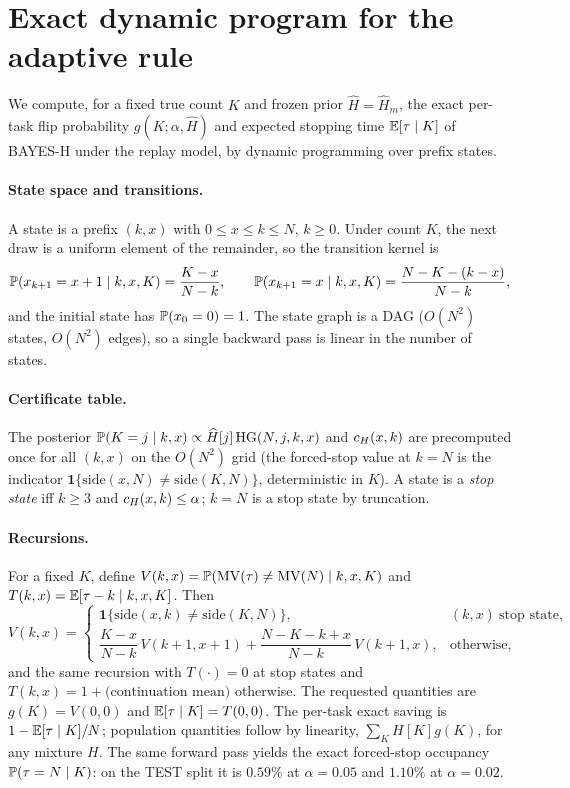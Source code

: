 \section{Exact dynamic program for the adaptive rule}
\label{app:dp}

We compute, for a fixed true count $K$ and frozen prior
$\widehat H=\widehat H_m$, the exact per-task flip probability
$g(K;\alpha,\widehat H)$ and expected stopping time $\E[\tau\mid K]$ of
BAYES-H under the replay model, by dynamic programming over prefix states.

\paragraph{State space and transitions.}
A state is a prefix $(k,x)$ with $0\le x\le k\le N$, $k\ge 0$. Under
count $K$, the next draw is a uniform element of the remainder, so the
transition kernel is
\[
\P(x_{k+1}=x+1\mid k,x,K)=\frac{K-x}{N-k},
\qquad
\P(x_{k+1}=x\mid k,x,K)=\frac{N-K-(k-x)}{N-k},
\]
and the initial state has $\P(x_0=0)=1$. The state graph is a DAG
($O(N^2)$ states, $O(N^2)$ edges), so a single backward pass is linear
in the number of states.

\paragraph{Certificate table.}
The posterior $\P(K=j\mid k,x)\propto \widehat H[j]\,\HG(N,j,k,x)$ and
$\cert(x,k)$ are precomputed once for all $(k,x)$ on the $O(N^2)$ grid
(the forced-stop value at $k=N$ is the indicator
$\mathbf 1\{\mathrm{side}(x,N)\neq\mathrm{side}(K,N)\}$, deterministic in
$K$). A state is a \emph{stop state} iff $k\ge 3$ and
$\cert(x,k)\le\alpha$; $k=N$ is a stop state by truncation.

\paragraph{Recursions.}
For a fixed $K$, define $V(k,x)=\P(\MV(\tau)\neq\MV(N)\mid k,x,K)$
and $T(k,x)=\E[\tau-k\mid k,x,K]$. Then
\[
V(k,x)=
\begin{cases}
\mathbf 1\{\mathrm{side}(x,k)\neq\mathrm{side}(K,N)\}, & (k,x)\ \text{stop state},\\[4pt]
\dfrac{K-x}{N-k}\,V(k+1,x+1)+\dfrac{N-K-k+x}{N-k}\,V(k+1,x), & \text{otherwise},
\end{cases}
\]
and the same recursion with
$T(\cdot)=0$ at stop states and $T(k,x)=1+\text{(continuation mean)}$
otherwise. The requested quantities are $g(K)=V(0,0)$ and
$\E[\tau\mid K]=T(0,0)$. The per-task exact saving is
$1-\E[\tau\mid K]/N$; population quantities follow by linearity,
$\sum_K H[K]g(K)$, for any mixture $H$. The same forward pass yields the
exact forced-stop occupancy $\P(\tau=N\mid K)$: on the TEST split it is
$0.59\%$ at $\alpha=0.05$ and $1.10\%$ at $\alpha=0.02$.

